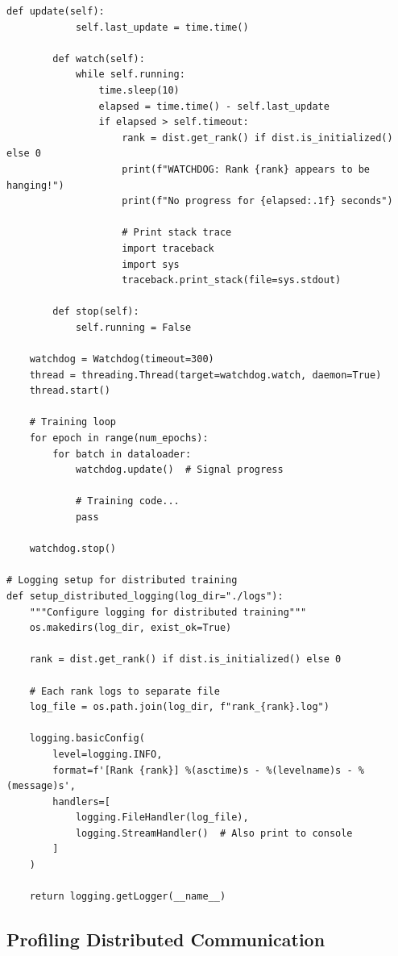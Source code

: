 \begin{lstlisting}[style=python, caption=Debugging utilities for distributed training]
        def update(self):
            self.last_update = time.time()

        def watch(self):
            while self.running:
                time.sleep(10)
                elapsed = time.time() - self.last_update
                if elapsed > self.timeout:
                    rank = dist.get_rank() if dist.is_initialized() else 0
                    print(f"WATCHDOG: Rank {rank} appears to be hanging!")
                    print(f"No progress for {elapsed:.1f} seconds")

                    # Print stack trace
                    import traceback
                    import sys
                    traceback.print_stack(file=sys.stdout)

        def stop(self):
            self.running = False

    watchdog = Watchdog(timeout=300)
    thread = threading.Thread(target=watchdog.watch, daemon=True)
    thread.start()

    # Training loop
    for epoch in range(num_epochs):
        for batch in dataloader:
            watchdog.update()  # Signal progress

            # Training code...
            pass

    watchdog.stop()

# Logging setup for distributed training
def setup_distributed_logging(log_dir="./logs"):
    """Configure logging for distributed training"""
    os.makedirs(log_dir, exist_ok=True)

    rank = dist.get_rank() if dist.is_initialized() else 0

    # Each rank logs to separate file
    log_file = os.path.join(log_dir, f"rank_{rank}.log")

    logging.basicConfig(
        level=logging.INFO,
        format=f'[Rank {rank}] %(asctime)s - %(levelname)s - %(message)s',
        handlers=[
            logging.FileHandler(log_file),
            logging.StreamHandler()  # Also print to console
        ]
    )

    return logging.getLogger(__name__)
\end{lstlisting}

\subsection{Profiling Distributed Communication}

